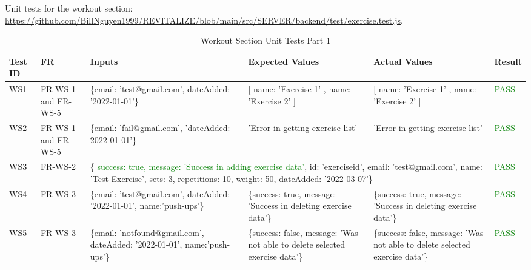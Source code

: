 \documentclass[12pt, titlepage]{article}
\begin{document}
Unit tests for the workout section: \url{https://github.com/BillNguyen1999/REVITALIZE/blob/main/src/SERVER/backend/test/exercise.test.js}.
\begin{table}[h]
\centering
\small
\begin{tabularx}{\textwidth}{|X|X|p{3cm}|p{2.5cm}|p{2.5cm}|X|}
	\hline
	Test ID & FR & Inputs & Expected Values & Actual Values & Result \\
	\hline
	WS1 & FR-WS-1 and FR-WS-5 & \{email: 'test@gmail.com', dateAdded: '2022-01-01'\}  & [{ name: 'Exercise 1' }, { name: 'Exercise 2' }] & [{ name: 'Exercise 1' }, { name: 'Exercise 2' }] & \textcolor{Green}{PASS} \\
	\hline
	WS2 & FR-WS-1 and FR-WS-5 & \{email: 'fail@gmail.com', 'dateAdded: 2022-01-01'\}  & 'Error in getting exercise list' & 'Error in getting exercise list' & \textcolor{Green}{PASS} \\
	\hline
	WS3 & FR-WS-2 & \multicolumn{3}{p{8cm}|}{\centering \{ \textcolor{Green}{success: true, message: 'Success in adding exercise data'}, id: 'exerciseid', email: 'test@gmail.com', name: 'Test Exercise', sets: 3, repetitions: 10, weight: 50, dateAdded: '2022-03-07'\}}  &  \textcolor{Green}{PASS}\\
	\hline
	WS4 & FR-WS-3 & \{email: 'test@gmail.com', dateAdded: '2022-01-01', name:'push-ups'\}  & \{success: true, message: 'Success in deleting exercise data'\} & \{success: true, message: 'Success in deleting exercise data'\} & \textcolor{Green}{PASS} \\
	\hline
	WS5 & FR-WS-3 & \{email: 'notfound@gmail.com', dateAdded: '2022-01-01', name:'push-ups'\}  & \{success: false, message: 'Was not able to delete selected exercise data'\} & \{success: false, message: 'Was not able to delete selected exercise data'\} & \textcolor{Green}{PASS} \\
	\hline
\end{tabularx}
\caption{Workout Section Unit Tests Part 1}
\label{table:workout-unit-tests}
\end{table}

\newpage
\end{document}
